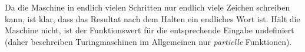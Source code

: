 Da die Maschine in endlich vielen Schritten nur endlich viele Zeichen schreiben kann, ist klar, dass das Resultat nach dem Halten ein endliches Wort ist.
Hält die Maschine nicht, ist der Funktionswert für die entsprechende Eingabe undefiniert (daher beschreiben Turingmaschinen im Allgemeinen nur \emph{partielle} Funktionen).




% 

